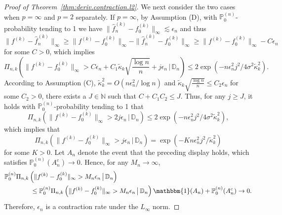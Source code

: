 \documentclass[12pt]{article}
\newcommand\data{\mathbb{D}_n}
\newcommand{\PP}{\mathbb{P}}
\theoremstyle{plain}
\theoremstyle{nonitalicremark}
\begin{document}
\begin{appendices}
\begin{proof}[Proof of Theorem~\ref{thm:deriv.contraction.l2}]
We next consider the two cases when $p=\infty$ and $p = 2$ separately. If $p = \infty$, by Assumption (D), with $\PP_0^{(n)}$-probability tending to 1 we have $\|\hat{f}_n^{(k)}-f_0^{(k)}\|_\infty\lesssim \epsilon_n$ and thus
\begin{equation}\label{eq:supremum.eq1}
\|f^{(k)}-\hat{f}_n^{(k)}\|_\infty\geq \|f^{(k)}-f_0^{(k)}\|_\infty-\|\hat{f}_n^{(k)}-f_0^{(k)}\|_\infty\geq \|f^{(k)}-f_0^{(k)}\|_\infty-C\epsilon_n
\end{equation}
for some $C>0$, which implies
\begin{equation}
\Pi_{n,k}\left(\|f^{(k)}-f_0^{(k)}\|_\infty>C\epsilon_n+C_1\tilde{\kappa}_{k}\sqrt{\frac{\log n}{n}}+j\epsilon_n\,\big|\,\data\right)\leq 2\exp\left(-n\epsilon_n^2j^2/4\sigma^2\tilde{\kappa}_{k}^2\right).
\end{equation}
According to Assumption (C), $\tilde{\kappa}_{k}^2=O(n\epsilon_n^2/\log n)$ and $\tilde{\kappa}_{k}\sqrt{\frac{\log n}{n}}\leq C_2\epsilon_n$ for some $C_2>0$, there exists a $J\in\mathbb{N}$ such that $C+C_1C_2\leq J$. Thus, for any $j\geq J$, it holds with $\PP_0^{(n)}$-probability tending to 1 that
\begin{equation}
\Pi_{n,k}\left(\|f^{(k)}-f_0^{(k)}\|_\infty>2j\epsilon_n\,\big|\,\data\right)\leq 2\exp\left(-n\epsilon_n^2j^2/4\sigma^2\tilde{\kappa}_{k}^2\right),
\end{equation}
which implies that
\begin{equation}
\Pi_{n,k}\left(\|f^{(k)}-f_0^{(k)}\|_\infty>j\epsilon_n\,\big|\,\data\right)=\exp\left(-Kn\epsilon_n^2j^2/\tilde{\kappa}_{k}^2\right)
\end{equation}
for some $K>0$. Let $A_n$ denote the event that the preceding display holds, which satisfies $\PP_0^{(n)}(A_n^c)\rightarrow0$. Hence, for any $M_n\rightarrow \infty$,
\begin{align}
& \PP_0^{(n)}\Pi_{n,k}\left(\|f^{(k)}-f_0^{(k)}\|_\infty>M_n\epsilon_n\,\big|\,\data\right)\\
&\qquad \qquad  \leq \PP_0^{(n)}\Pi_{n,k}\left(\|f^{(k)}-f_0^{(k)}\|_\infty>M_n\epsilon_n\,\big|\,\data\right)\mathbbm{1}(A_n)+\PP_0^{(n)}(A_n^c)
\rightarrow 0.
\end{align}
Therefore, $\epsilon_n$ is a contraction rate under the $L_\infty$ norm.


\end{proof}
\end{appendices}
\end{document}
